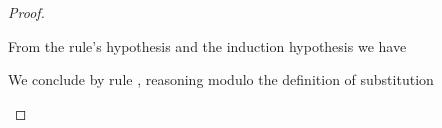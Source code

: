 \begin{proof}
\begin{description}
  From the rule's hypothesis and the induction hypothesis we have 
\begin{myequation*}
\end{myequation*}

  We conclude by rule , reasoning modulo
  the definition of substitution
\begin{myequation*}
\end{myequation*}
\end{description}
\end{proof}



